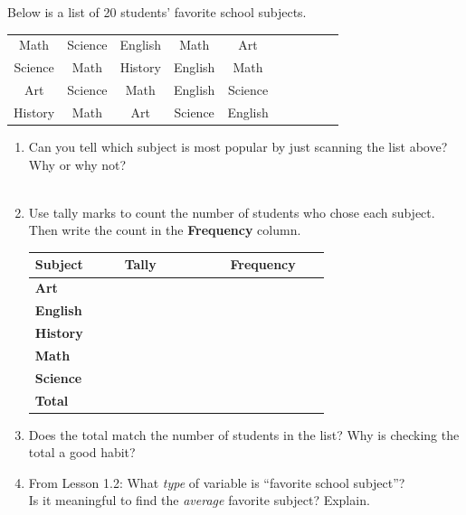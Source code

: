 \documentclass[10pt]{article}
\begin{document}
\namedateperiod

\vspace{0.18in}

\noindent Below is a list of 20 students' favorite school subjects.

\vspace{0.1in}

\begin{center}
\small
\begin{tabular}{*{10}{c}}
Math & Science & English & Math & Art \\
Science & Math & History & English & Math \\
Art & Science & Math & English & Science \\
History & Math & Art & Science & English \\
\end{tabular}
\end{center}

\vspace{0.18in}

\begin{enumerate}

  \item Can you tell which subject is most popular by just scanning the list above?
        Why or why not?\\[6pt]
        \writeline\\[1pt]\writeline

  \item Use tally marks to count the number of students who chose each subject.
        Then write the count in the \textbf{Frequency} column.

\vspace{0.1in}
\renewcommand{\arraystretch}{1.8}
\begin{tabularx}{\linewidth}{@{} >{\bfseries}p{0.22\linewidth}
                                    C{0.26\linewidth} C{0.2\linewidth} @{}}
\textbf{Subject} & \textbf{Tally} & \textbf{Frequency} \\
\midrule
Art     & & \\
English & & \\
History & & \\
Math    & & \\
Science & & \\
\midrule
{}\textbf{Total} & & \\
\end{tabularx}

  \item Does the total match the number of students in the list? \blank{1.5cm}
        Why is checking the total a good habit?\\[6pt]
        \writeline

  \item From Lesson 1.2: What \textit{type} of variable is ``favorite school subject''?
        \blank{3cm}\\[4pt]
        Is it meaningful to find the \textit{average} favorite subject? Explain.\\[6pt]
        \writeline

\end{enumerate}
\end{document}
